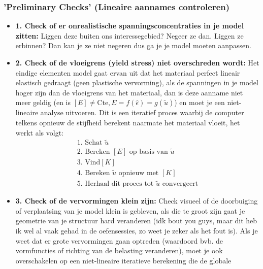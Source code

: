 \documentclass[a4paper,11pt,twoside]{report}
\begin{document}
\subsubsection{'Preliminary Checks' (Lineaire aannames controleren)}
\begin{itemize}
    \item \textbf{1. Check of er onrealistische spanningsconcentraties in je model zitten:
              \newline}
          Liggen deze buiten ons interessegebied? Negeer ze dan. Liggen ze erbinnen? Dan kan je ze niet
          negeren dus ga je je model moeten aanpassen.
    \item \textbf{2. Check of de vloeigrens (yield stress) niet overschreden wordt:}
          \newline
          Het eindige elementen model gaat ervan uit dat het materiaal perfect lineair elastisch gedraagt
          (geen plastische vervorming), als de spanningen in je model hoger zijn dan de vloeigrens van het
          materiaal, dan is deze aanname niet meer geldig (en is
          $[E] \neq \text{Cte}, E = f(\hat{\epsilon}) = g(\tilde{u})$) en moet je een niet-lineaire analyse
          uitvoeren. Dit is een iteratief proces waarbij de computer telkens opnieuw de stijfheid berekent
          naarmate het materiaal vloeit, het werkt als volgt:
          \begin{gather*}
              \text{1. Schat } \tilde{u} \\
              \text{2. Bereken } [E] \text{ op basis van } \tilde{u} \\
              \text{3. Vind} [K] \\
              \text{4. Bereken } \tilde{u} \text{ opnieuw met } [K] \\
              \text{5. Herhaal dit proces tot } \tilde{u} \text{ convergeert}
          \end{gather*}
    \item \textbf{3. Check of de vervormingen klein zijn:}
          \newline
          Check visueel of de doorbuiging of verplaatsing van je model klein is gebleven, als die te groot
          zijn gaat je geometrie van je structuur hard veranderen (idk bout you guys, maar dit heb ik wel al
          vaak gehad in de oefensessies, zo weet je zeker als het fout is). Als je weet dat er grote
          vervormingen gaan optreden (waardoord bvb. de vormfuncties of richting van de belasting
          veranderen), moet je ook overschakelen op een niet-lineaire iteratieve berekening die de globale

\end{itemize}
\end{document}
